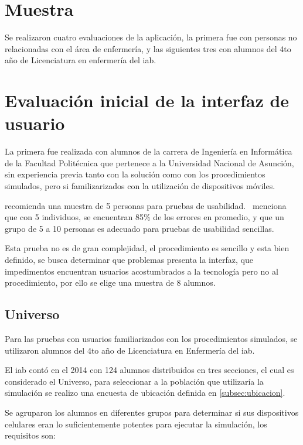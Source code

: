 \section{Muestra}

Se realizaron cuatro evaluaciones de la aplicación, la primera fue con personas
no relacionadas con el área de enfermería, y las siguientes tres con alumnos del
4to año de Licenciatura en enfermería del \Gls{iab}.

\section{Evaluación inicial de la interfaz de usuario}

La primera fue realizada con alumnos de la carrera de Ingeniería en Informática
de la Facultad Politécnica que pertenece a la Universidad Nacional de Asunción,
sin experiencia previa tanto con la solución como con los procedimientos
simulados, pero si familizarizados con la utilización de dispositivos móviles.

\cite{nielsen2000} recomienda una muestra de 5 personas para pruebas de
usabilidad.~\cite{ritch2009} menciona que con 5 individuos, se encuentran 85\%
de los errores en promedio, y que un grupo de 5 a 10 personas es adecuado para
pruebas de usabilidad sencillas.

Esta prueba no es de gran complejidad, el procedimiento es sencillo y esta
bien definido, se busca determinar que problemas presenta la interfaz, que
impedimentos encuentran usuarios acostumbrados a la tecnología pero no al
procedimiento, por ello se elige una muestra de 8 alumnos.

\subsection{Universo}
\label{subsec:universo}

Para las pruebas con usuarios familiarizados con los procedimientos simulados,
se utilizaron alumnos del 4to año de Licenciatura en Enfermería del \Gls{iab}.

El \Gls{iab} contó en el 2014 con 124 alumnos distribuidos en tres secciones, 
el cual es considerado el Universo, para seleccionar a la población que utilizaría
la simulación se realizo una encuesta de ubicación definida en \ref{subsec:ubicacion}.

Se agruparon los alumnos en diferentes grupos para determinar si sus dispositivos
celulares eran lo suficientemente potentes para 
ejecutar la simulación, los requisitos son:

